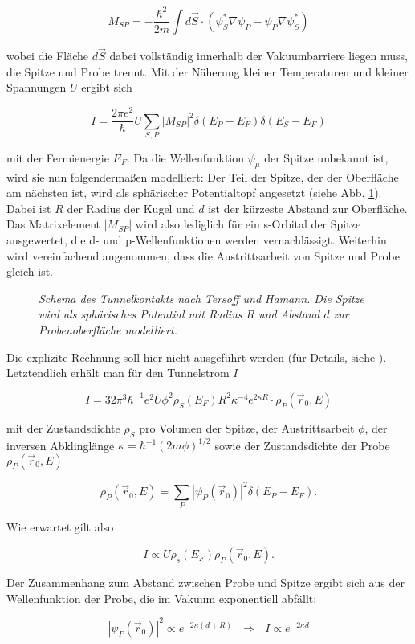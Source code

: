 \[M_{SP}=-\frac{\hbar^2}{2m}\int d\vec{S}\cdot(\psi_{S}^*\nabla\psi_{P} -
\psi_{P}\nabla\psi_{S}^*) \]

wobei die Fläche $d\vec{S}$ dabei vollständig innerhalb der Vakuumbarriere liegen muss, die
Spitze und Probe trennt. Mit der Näherung kleiner Temperaturen und kleiner Spannungen $U$ ergibt
sich

\[I=\frac{2\pi e^2}{\hbar}U\sum_{S,P}|M_{SP}|^2\delta(E_{P}-E_{F}) \delta(E_{S}-E_{F})\]

mit der Fermienergie $E_F$. Da die Wellenfunktion $\psi_{\mu}$ der Spitze unbekannt ist, wird sie
nun folgendermaßen modelliert: Der Teil der Spitze, der der Oberfläche am nächsten ist, wird als
sphärischer Potentialtopf angesetzt (siehe Abb. \ref{spitze}). Dabei ist $R$ der Radius der Kugel
und $d$ ist der kürzeste Abstand zur Oberfläche. Das Matrixelement $|M_{SP}|$ wird
also lediglich für ein s-Orbital der Spitze ausgewertet, die d- und p-Wellenfunktionen werden
vernachlässigt. Weiterhin wird vereinfachend angenommen, dass die Austrittsarbeit von Spitze und
Probe gleich ist.

\begin{figure}[H]
\captionsetup{format=plain}
\centering

\caption{\textit{Schema des Tunnelkontakts nach Tersoff und Hamann. Die Spitze wird als sphärisches
Potential mit Radius $R$ und Abstand $d$ zur Probenoberfläche modelliert.}}
\label{spitze}
\end{figure}
 
 Die explizite Rechnung soll hier nicht ausgeführt werden (für Details, siehe \cite{Ter83}).
 Letztendlich erhält man für den Tunnelstrom $I$
 
 \[I=32\pi^3\hbar^{-1}e^2U\phi^2\rho_{S}(E_F)R^2\kappa^{-4}e^{2\kappa
 R}\cdot\rho_P(\vec{r}_0, E)\]
 
 mit der Zustandsdichte $\rho_{S}$ pro Volumen der Spitze, der Austrittsarbeit $\phi$, der inversen
 Abklinglänge $\kappa=\hbar^{-1}(2m\phi)^{1/2}$ sowie der Zustandsdichte der Probe
 $\rho_P(\vec{r}_0, E)$
 
 \[\rho_P(\vec{r}_0, E)=\sum_{P}|\psi_{P}(\vec{r}_0)|^2\delta(E_{P}-E_F).\]
 
 Wie erwartet gilt also
 
 \[I\propto U \rho_{s}(E_F) \rho_P(\vec{r}_0, E).\]
 
 Der Zusammenhang zum Abstand zwischen Probe und Spitze ergibt sich aus der
 Wellenfunktion der Probe, die im Vakuum exponentiell abfällt:
 
 \[|\psi_P(\vec{r}_0)|^2\propto e^{-2\kappa(d+R)}~~~\Rightarrow~~~I\propto e^{-2\kappa d}\]
 
